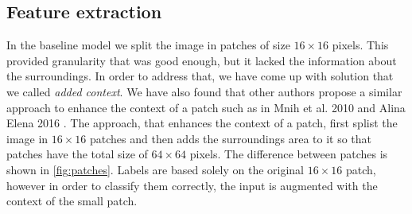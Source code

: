 \documentclass[10pt,conference,compsocconf]{IEEEtran}
\begin{document}
\subsection{Feature extraction}
\label{sec:feature}
In the baseline model we split the image in patches of size $16\times16$ pixels. This provided granularity
that was good enough, but it lacked the information about the surroundings. In order to address that, we have come up
with solution that we called \textit{added context}. We have also found that other authors propose a similar approach to enhance the context of a patch such as in Mnih et al. 2010 \cite{Mnih2010} and Alina Elena 2016 \cite{mthesis}. The approach, that enhances the context of a patch, first splist the image in $16\times16$ patches and then adds the 
surroundings area to it so that patches have the total size of $64\times64$ pixels. The difference between patches is
shown in \ref{fig:patches}. Labels are based solely on the original $16\times16$ patch, however in order to classify them correctly, the input is augmented with the context of the small patch.
\end{document}
